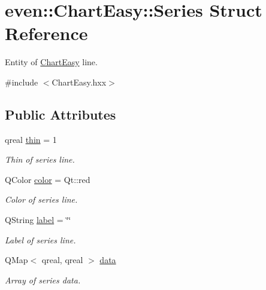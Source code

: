 \hypertarget{structeven_1_1_chart_easy_1_1_series}{}\section{even\+:\+:Chart\+Easy\+:\+:Series Struct Reference}
\label{structeven_1_1_chart_easy_1_1_series}


Entity of \mbox{\hyperlink{classeven_1_1_chart_easy}{Chart\+Easy}} line.  




{\ttfamily \#include $<$Chart\+Easy.\+hxx$>$}

\subsection*{Public Attributes}
\begin{DoxyCompactItemize}
\item 
\mbox{\label{structeven_1_1_chart_easy_1_1_series_a461cdb9fffa638c303820278b68d4081}} 
qreal \mbox{\hyperlink{structeven_1_1_chart_easy_1_1_series_a461cdb9fffa638c303820278b68d4081}{thin}} = 1
\begin{DoxyCompactList}\small\item\em Thin of series line. \end{DoxyCompactList}\item 
\mbox{\label{structeven_1_1_chart_easy_1_1_series_ad7da3b211a6be878b17adcddb5c345a6}} 
Q\+Color \mbox{\hyperlink{structeven_1_1_chart_easy_1_1_series_ad7da3b211a6be878b17adcddb5c345a6}{color}} = Qt\+::red
\begin{DoxyCompactList}\small\item\em Color of series line. \end{DoxyCompactList}\item 
\mbox{\label{structeven_1_1_chart_easy_1_1_series_ae99c38df2171c7d2ad1201d51a7d4693}} 
Q\+String \mbox{\hyperlink{structeven_1_1_chart_easy_1_1_series_ae99c38df2171c7d2ad1201d51a7d4693}{label}} = \char`\"{}\char`\"{}
\begin{DoxyCompactList}\small\item\em Label of series line. \end{DoxyCompactList}\item 
\mbox{\label{structeven_1_1_chart_easy_1_1_series_aaf5ce805c8a0efb47de8fbcf5fff73e3}} 
Q\+Map$<$ qreal, qreal $>$ \mbox{\hyperlink{structeven_1_1_chart_easy_1_1_series_aaf5ce805c8a0efb47de8fbcf5fff73e3}{data}}
\begin{DoxyCompactList}\small\item\em Array of series data. \end{DoxyCompactList}\end{DoxyCompactItemize}


